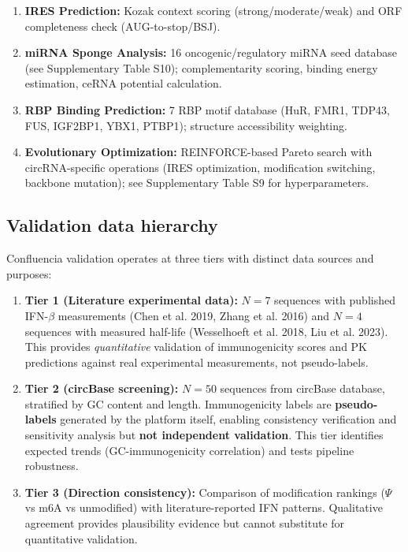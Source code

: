 \begin{enumerate}[noitemsep,topsep=0pt]
\item \textbf{IRES Prediction:} Kozak context scoring (strong/moderate/weak) and ORF completeness check (AUG-to-stop/BSJ).
\item \textbf{miRNA Sponge Analysis:} 16 oncogenic/regulatory miRNA seed database (see Supplementary Table S10); complementarity scoring, binding energy estimation, ceRNA potential calculation.
\item \textbf{RBP Binding Prediction:} 7 RBP motif database (HuR, FMR1, TDP43, FUS, IGF2BP1, YBX1, PTBP1); structure accessibility weighting.
\item \textbf{Evolutionary Optimization:} REINFORCE-based Pareto search with circRNA-specific operations (IRES optimization, modification switching, backbone mutation); see Supplementary Table S9 for hyperparameters.
\end{enumerate}

\subsection*{Validation data hierarchy}
Confluencia validation operates at three tiers with distinct data sources and purposes:

\begin{enumerate}[noitemsep,topsep=0pt]
\item \textbf{Tier 1 (Literature experimental data):} $N{=}7$ sequences with published IFN-$\beta$ measurements (Chen et al. 2019, Zhang et al. 2016) and $N{=}4$ sequences with measured half-life (Wesselhoeft et al. 2018, Liu et al. 2023). This provides \textit{quantitative} validation of immunogenicity scores and PK predictions against real experimental measurements, not pseudo-labels.

\item \textbf{Tier 2 (circBase screening):} $N{=}50$ sequences from circBase database, stratified by GC content and length. Immunogenicity labels are \textbf{pseudo-labels} generated by the platform itself, enabling consistency verification and sensitivity analysis but \textbf{not independent validation}. This tier identifies expected trends (GC-immunogenicity correlation) and tests pipeline robustness.

\item \textbf{Tier 3 (Direction consistency):} Comparison of modification rankings ($\Psi$ vs m6A vs unmodified) with literature-reported IFN patterns. Qualitative agreement provides plausibility evidence but cannot substitute for quantitative validation.
\end{enumerate}


